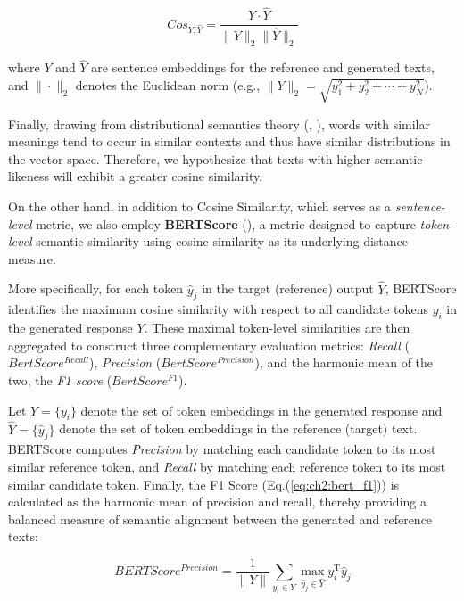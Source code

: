 \begin{equation*}
    Cos_{Y, \hat{Y}} = \frac{Y \cdot \hat{Y}}{\|Y\|_2 \|\hat{Y}\|_2}
\end{equation*}

where $Y$ and $\hat{Y}$ are sentence embeddings for the reference and generated texts, and $\|\cdot\|_2$ denotes the Euclidean norm (e.g., $\|Y\|_2=\sqrt{y_1^2+y_2^2+\cdots+y_N^2}$).


Finally, drawing from distributional semantics theory (\cite{firth1957linguistics}, \cite{sahlgren2008distributional}), words with similar meanings tend to occur in similar contexts and thus have similar distributions in the vector space. Therefore, we hypothesize that texts with higher semantic likeness will exhibit a greater cosine similarity. 



On the other hand, in addition to Cosine Similarity, which serves as a \textit{sentence-level} metric, we also employ \textbf{BERTScore} (\cite{zhang2019bertscore}), a metric designed to capture \textit{token-level} semantic similarity using cosine similarity as its underlying distance measure.

More specifically, for each token $\hat{y}_j$ in the target (reference) output $\hat{Y}$, BERTScore identifies the maximum cosine similarity with respect to all candidate tokens $y_i$ in the generated response $Y$. These maximal token-level similarities are then aggregated to construct three complementary evaluation metrics: \textit{Recall} ($BertScore^{Recall}$), \textit{Precision} ($BertScore^{Precision}$), and the harmonic mean of the two, the \textit{F1 score} ($BertScore^{F1}$).


Let $Y=\{y_i\}$ denote the set of token embeddings in the generated response and $\hat{Y}=\{\hat{y}_j\}$ denote the set of token embeddings in the reference (target) text. BERTScore computes \textit{Precision} by matching each candidate token to its most similar reference token, and \textit{Recall} by matching each reference token to its most similar candidate token. Finally, the F1 Score (Eq.(\ref{eq:ch2:bert_f1})) is calculated as the harmonic mean of precision and recall, thereby providing a balanced measure of semantic alignment between the generated and reference texts:


\begin{equation}\label{eq:ch2:bert_precision}
    BERTScore^{Precision} = \frac{1}{\|Y\|}\sum_{y_i \in Y} \max_{\hat{y}_j \in \hat{Y}} y_i^{\text{T}}\hat{y}_j
\end{equation}

